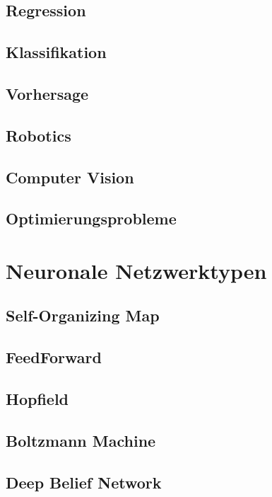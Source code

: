 \subsection{Regression}

\subsection{Klassifikation}

\subsection{Vorhersage}

\subsection{Robotics}

\subsection{Computer Vision}

\subsection{Optimierungsprobleme}


\section{Neuronale Netzwerktypen}

\subsection{Self-Organizing Map}

\subsection{FeedForward}

\subsection{Hopfield}

\subsection{Boltzmann Machine}

\subsection{Deep Belief Network}

